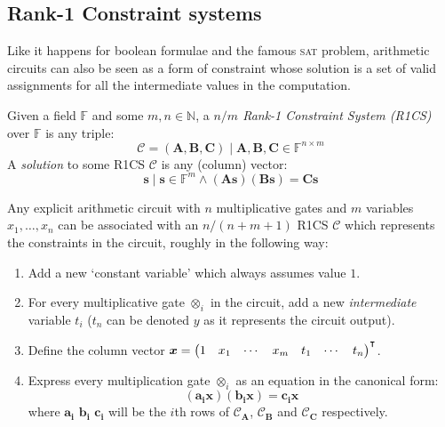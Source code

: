 \subsection{Rank-1 Constraint systems}
Like it happens for boolean formulae and the famous \textsc{sat} problem, arithmetic circuits can
also be seen as a form of constraint whose solution is a set of valid assignments for all the
intermediate values in the computation.
\begin{definition}
	Given a field \(\mathbb{F}\) and some \(m, n \in \mathbb{N}\), a
	\emph{\(n/m\) Rank-1 Constraint System (R1CS)} over \(\mathbb{F}\) is any triple:
	\[\mathcal{C} = (\bm{A}, \bm{B}, \bm{C}) \mid \bm{A}, \bm{B}, \bm{C} \in \mathbb{F}^{n \times m} \]
	A \emph{solution} to some R1CS \(\mathcal{C}\) is any (column) vector:
	\[\bm{s} \mid \bm{s} \in \mathbb{F}^m \land
		(\bm{A}\bm{s})(\bm{B}\bm{s}) = \bm{C}\bm{s} \]
\end{definition}

\noindent Any explicit arithmetic circuit with \(n\) multiplicative gates and \(m\) variables
\(x_1, \dots, x_n\) can be associated with an \(n/(n+m+1)\) R1CS \(\mathcal{C}\) which represents
the constraints in the circuit, roughly in the following way:
\begin{enumerate}
	\item Add a new `constant variable' which always assumes value \(1\).
	\item For every multiplicative gate \(\otimes_i \) in the circuit, add a new \emph{intermediate}
	      variable \(t_i\) (\(t_n\) can be denoted \(y\) as it represents the circuit output).
	\item Define the column vector
	      \(\bm{x} = {\begin{pmatrix}1 & x_1 & \cdots & x_m & t_1 & \cdots & t_n
	      \end{pmatrix}}^\transpose \).
	\item Express every multiplication gate \(\otimes_i \) as an equation in the canonical form:
	      \[(\bm{a_i}\bm{x})(\bm{b_i}\bm{x}) = \bm{c_i}\bm{x}\]
	      where \(\bm{a_i}\) \(\bm{b_i}\) \(\bm{c_i}\) will be the \(i\)th rows of
	      \(\mathcal{C}_{\bm{A}}\), \(\mathcal{C}_{\bm{B}}\) and \(\mathcal{C}_{\bm{C}}\) respectively.
\end{enumerate}


